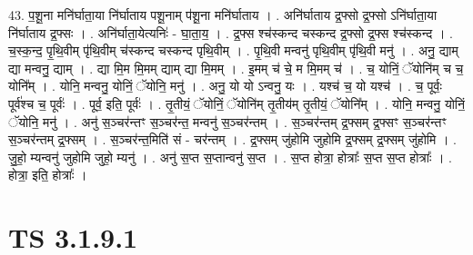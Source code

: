 \documentclass[17pt]{extarticle}
\begin{document}
43. प॒शू॒ना मनि॑र्घाता॒या नि॑र्घाताय पशू॒नाम् प॑शू॒ना मनि॑र्घाताय । . अनि॑र्घाताय द्र॒फ्सो द्र॒फ्सो ऽनि॑र्घाता॒या नि॑र्घाताय द्र॒फ्सः । . अनि॑र्घाता॒येत्यनिः॑ - घा॒ता॒य॒ । . द्र॒फ्स श्च॑स्कन्द चस्कन्द द्र॒फ्सो द्र॒फ्स श्च॑स्कन्द । . च॒स्क॒न्द॒ पृ॒थि॒वीम् पृ॑थि॒वीम् च॑स्कन्द चस्कन्द पृथि॒वीम् । . पृ॒थि॒वी मन्वनु॑ पृथि॒वीम् पृ॑थि॒वी मनु॑ । . अनु॒ द्याम् द्या मन्वनु॒ द्याम् । . द्या मि॒म मि॒मम् द्याम् द्या मि॒मम् । . इ॒मम् च॑ चे॒ म मि॒मम् च॑ । . च॒ योनिं॒ ॅयोनि॑म् च च॒ योनि᳚म् । . योनि॒ मन्वनु॒ योनिं॒ ॅयोनि॒ मनु॑ । . अनु॒ यो यो ऽन्वनु॒ यः । . यश्च॑ च॒ यो यश्च॑ । . च॒ पूर्वः॒ पूर्व॑श्च च॒ पूर्वः॑ । . पूर्व॒ इति॒ पूर्वः॑ । . तृ॒तीयं॒ ॅयोनिं॒ ॅयोनि॑म् तृ॒तीय॑म् तृ॒तीयं॒ ॅयोनि᳚म् । . योनि॒ मन्वनु॒ योनिं॒ ॅयोनि॒ मनु॑ । . अनु॑ स॒ञ्चर॑न्तꣳ स॒ञ्चर॑न्त॒ मन्वनु॑ स॒ञ्चर॑न्तम् । . स॒ञ्चर॑न्तम् द्र॒फ्सम् द्र॒फ्सꣳ स॒ञ्चर॑न्तꣳ स॒ञ्चर॑न्तम् द्र॒फ्सम् । . स॒ञ्चर॑न्त॒मिति॑ सं - चर॑न्तम् । . द्र॒फ्सम् जु॑होमि जुहोमि द्र॒फ्सम् द्र॒फ्सम् जु॑होमि । . जु॒हो॒ म्यन्वनु॑ जुहोमि जुहो॒ म्यनु॑ । . अनु॑ स॒प्त स॒प्तान्वनु॑ स॒प्त । . स॒प्त होत्रा॒ होत्राः᳚ स॒प्त स॒प्त होत्राः᳚ । . होत्रा॒ इति॒ होत्राः᳚ । \newline
\pagebreak
{}

\section{ TS 3.1.9.1 }
\end{document}
